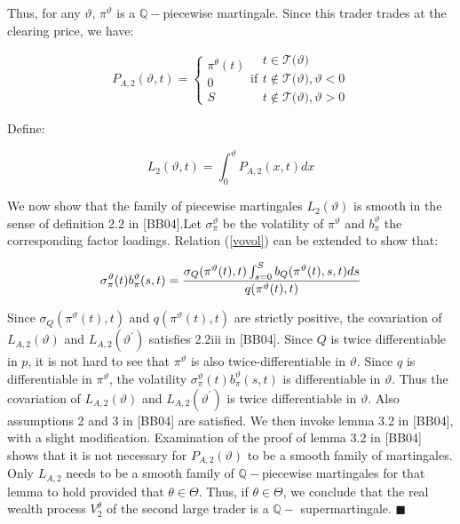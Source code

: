 \documentclass{article}
\begin{document}
Thus, for any $\vartheta $, $\pi ^{\vartheta }$ is a $\mathbb{Q}-$piecewise
martingale. Since this trader trades at the clearing price, we have:

\begin{equation*}
P_{A,2}(\vartheta ,t)=\left\{
\begin{array}{c}
\pi ^{\theta }(t) \\
0 \\
S%
\end{array}%
\right. \text{if}%
\begin{array}{c}
t\in \mathcal{T(}\vartheta ) \\
t\notin \mathcal{T(}\vartheta ),\vartheta <0 \\
t\notin \mathcal{T(}\vartheta ),\vartheta >0%
\end{array}%
\end{equation*}

Define:

\begin{equation*}
L_{2}(\vartheta ,t)=\int_{0}^{\vartheta }P_{A,2}(x,t)dx
\end{equation*}

We now show that the family of piecewise martingales $L_{2}(\vartheta )$ is
smooth in the sense of definition 2.2 in [BB04]$.$Let $\sigma _{\pi
}^{\vartheta }$ be the volatility of $\pi ^{\vartheta }$ and $b_{\pi
}^{\vartheta }$ the corresponding factor loadings. Relation (\ref{vovol})
can be extended to show that:

\begin{equation*}
\sigma _{\pi }^{\vartheta }(t)b_{\pi }^{\vartheta }(s,t)=\frac{\sigma
_{Q}(\pi ^{\vartheta }(t),t)\int_{s=0}^{S}b_{Q}(\pi ^{\vartheta }(t),s,t)ds}{%
q(\pi ^{\vartheta }(t),t)}
\end{equation*}

Since $\sigma _{Q}(\pi ^{\vartheta }(t),t)$ and $q(\pi ^{\vartheta }(t),t)$
are strictly positive, the covariation of $L_{A,2}(\vartheta )$ and $%
L_{A,2}(\vartheta ^{\prime })$ satisfies 2.2iii in [BB04]. Since $Q$ is
twice differentiable in $p$, it is not hard to see that $\pi ^{\vartheta }$
is also twice-differentiable in $\vartheta $. Since $q$ is differentiable in
$\pi ^{\vartheta }$, the volatility $\sigma _{\pi }^{\vartheta }(t)b_{\pi
}^{\vartheta }(s,t)$ is differentiable in $\vartheta $. Thus the covariation
of $L_{A,2}(\vartheta )$ and $L_{A,2}(\vartheta ^{\prime })$ is twice
differentiable in $\vartheta $. Also assumptions 2 and 3 in [BB04] are
satisfied. We then invoke lemma 3.2 in [BB04], with a slight modification.
Examination of the proof of lemma 3.2 in [BB04] shows that it is not
necessary for $P_{A,2}(\vartheta )$ to be a smooth family of martingales.
Only $L_{A,2}$ needs to be a smooth family of $\mathbb{Q}-$piecewise
martingales for that lemma to hold provided that $\theta \in \Theta $. Thus,
if $\theta \in \Theta $, we conclude that the real wealth process $%
V_{2}^{\theta }$ of the second large trader is a $\mathbb{Q-}$
supermartingale. $\blacksquare $
\end{document}
